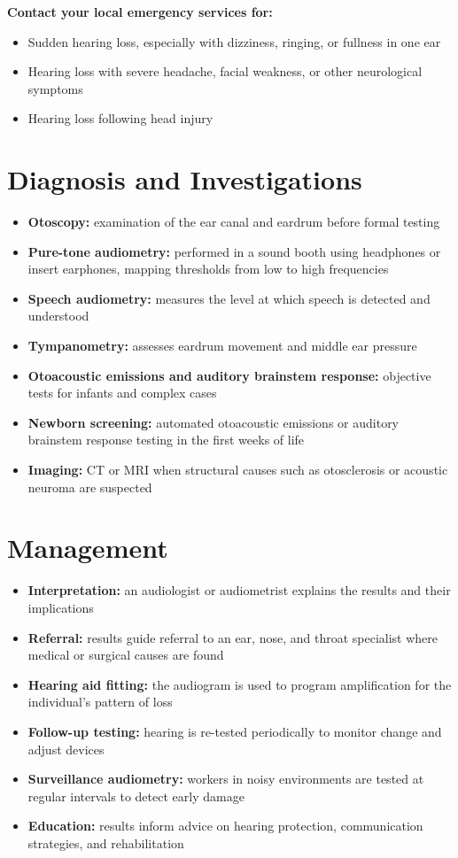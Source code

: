 \textbf{Contact your local emergency services for:}
\begin{itemize}
    \item Sudden hearing loss, especially with dizziness, ringing, or fullness in one ear
    \item Hearing loss with severe headache, facial weakness, or other neurological symptoms
    \item Hearing loss following head injury
\end{itemize}

\section*{Diagnosis and Investigations}
\begin{itemize}
    \item \textbf{Otoscopy:} examination of the ear canal and eardrum before formal testing
    \item \textbf{Pure-tone audiometry:} performed in a sound booth using headphones or insert earphones, mapping thresholds from low to high frequencies
    \item \textbf{Speech audiometry:} measures the level at which speech is detected and understood
    \item \textbf{Tympanometry:} assesses eardrum movement and middle ear pressure
    \item \textbf{Otoacoustic emissions and auditory brainstem response:} objective tests for infants and complex cases
    \item \textbf{Newborn screening:} automated otoacoustic emissions or auditory brainstem response testing in the first weeks of life
    \item \textbf{Imaging:} CT or MRI when structural causes such as otosclerosis or acoustic neuroma are suspected
\end{itemize}

\section*{Management}
\begin{itemize}
    \item \textbf{Interpretation:} an audiologist or audiometrist explains the results and their implications
    \item \textbf{Referral:} results guide referral to an ear, nose, and throat specialist where medical or surgical causes are found
    \item \textbf{Hearing aid fitting:} the audiogram is used to program amplification for the individual's pattern of loss
    \item \textbf{Follow-up testing:} hearing is re-tested periodically to monitor change and adjust devices
    \item \textbf{Surveillance audiometry:} workers in noisy environments are tested at regular intervals to detect early damage
    \item \textbf{Education:} results inform advice on hearing protection, communication strategies, and rehabilitation
\end{itemize}

